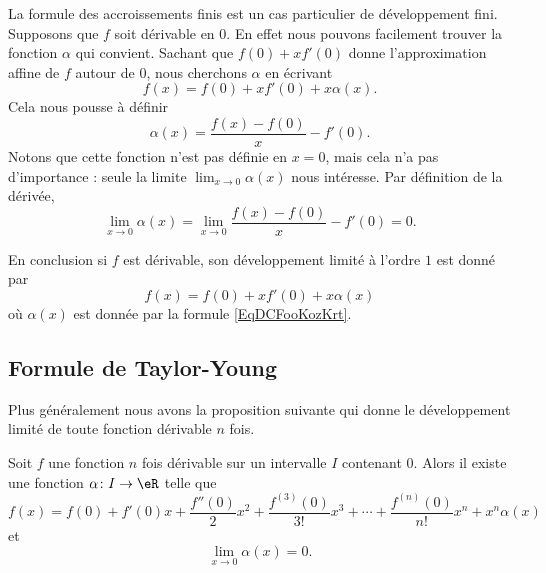 La formule des accroissements finis est un cas particulier de développement fini. Supposons que \( f\) soit dérivable en \( 0\). En effet nous pouvons facilement trouver la fonction \( \alpha\) qui convient. Sachant que \( f(0)+xf'(0)\) donne l'approximation affine de \( f\) autour de \( 0\), nous cherchons \( \alpha\) en écrivant
\begin{equation}
	f(x)=f(0)+xf'(0)+x\alpha(x).
\end{equation}
Cela nous pousse à définir
\begin{equation}    \label{EqDCFooKozKrt}
	\alpha(x)=\frac{ f(x)-f(0) }{ x }-f'(0).
\end{equation}
Notons que cette fonction n'est pas définie en \( x=0\), mais cela n'a pas d'importance : seule la limite \( \lim_{x\to 0} \alpha(x)\) nous intéresse. Par définition de la dérivée,
\begin{equation}
	\lim_{x\to 0} \alpha(x)=\lim_{x\to 0} \frac{ f(x)-f(0) }{ x }-f'(0)=0.
\end{equation}

En conclusion si \( f\) est dérivable, son développement limité à l'ordre \(  1\) est donné par
\begin{equation}
	f(x)=f(0)+xf'(0)+x\alpha(x)
\end{equation}
où \( \alpha(x)\) est donnée par la formule \eqref{EqDCFooKozKrt}.

\subsection{Formule de Taylor-Young}

Plus généralement nous avons la proposition suivante qui donne le développement limité de toute fonction dérivable \( n\) fois.

\begin{proposition}    \label{PropVDGooCexFwy}
	Soit \( f\) une fonction \( n\) fois dérivable sur un intervalle \( I\) contenant \( 0\). Alors il existe une fonction \( \alpha\colon I\to \eR\) telle que
	\begin{equation}        \label{EQooBKZDooTqYyIB}
		f(x)=f(0)+f'(0)x+\frac{ f''(0) }{ 2 }x^2+\frac{ f^{(3)}(0) }{ 3! }x^3+\cdots +\frac{ f^{(n)}(0) }{ n! }x^n+x^n\alpha(x)
	\end{equation}
	et
	\begin{equation}
		\lim_{x\to 0} \alpha(x)=0.
	\end{equation}
\end{proposition}

